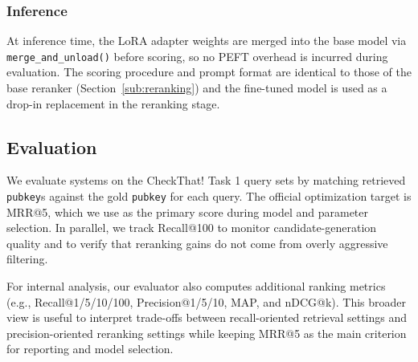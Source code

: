 \subsubsection*{Inference}
At inference time, the LoRA adapter weights are merged into the base model via \texttt{merge\_and\_unload()} before scoring, so no PEFT overhead is incurred during evaluation. The scoring procedure and prompt format are identical to those of the base reranker (Section~\ref{sub:reranking}) and the fine-tuned model is used as a drop-in replacement in the reranking stage.

\subsection{Evaluation}
We evaluate systems on the CheckThat! Task 1 query sets by matching retrieved \texttt{pubkey}s against the gold \texttt{pubkey} for each query. The official optimization target is MRR@5, which we use as the primary score during model and parameter selection. In parallel, we track Recall@100 to monitor candidate-generation quality and to verify that reranking gains do not come from overly aggressive filtering.

For internal analysis, our evaluator also computes additional ranking metrics (e.g., Recall@1/5/10/100, Precision@1/5/10,
MAP, and nDCG@k). This broader view is useful to interpret trade-offs between recall-oriented retrieval settings and
precision-oriented reranking settings while keeping MRR@5 as the main criterion for reporting and model selection.
